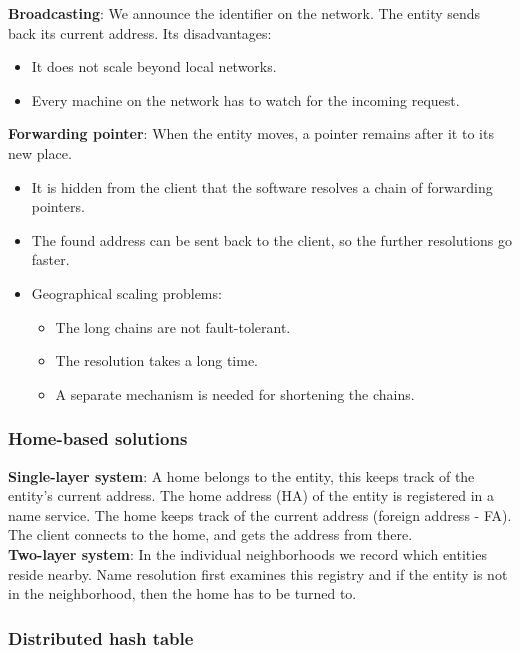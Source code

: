 \documentclass[margin=0px]{article}
\begin{document}
\noindent \textbf{Broadcasting}: We announce the identifier on the network. The entity sends back its current address.
Its disadvantages:
\begin{itemize}
    \item	It does not scale beyond local networks.

    \item	Every machine on the network has to watch for the incoming request.
\end{itemize}

\noindent \textbf{Forwarding pointer}: When the entity moves, a pointer remains after it to its new place.
\begin{itemize}
    \item	It is hidden from the client that the software resolves a chain of forwarding pointers.
    \item	The found address can be sent back to the client, so the further resolutions go faster.
    \item	Geographical scaling problems:
          \begin{itemize}
              \item	The long chains are not fault-tolerant.
              \item	The resolution takes a long time.
              \item	A separate mechanism is needed for shortening the chains.
          \end{itemize}
\end{itemize}

\subsubsection{Home-based solutions}

\noindent \textbf{Single-layer system}: A home belongs to the entity, this keeps track of the entity's current address. The
home address (HA) of the entity is registered in a name service. The home keeps track of the current
address (foreign address - FA). The client connects to the home, and gets the address from there.\\

\noindent \textbf{Two-layer system}: In the individual neighborhoods we record which entities reside nearby.
Name resolution first examines this registry and if the entity is not in the neighborhood, then the home has to be turned to.

\subsubsection{Distributed hash table}
\end{document}
